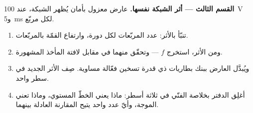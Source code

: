 \begin{problem}
\medskip\noindent\textbf{القسم الثالث --- أثر الشبكة نفسها.}
عارض معزول بأمان يُظهر الشبكة، عند \qty{100}{V} و\qty{5}{ms}
لكل مربّع.
\begin{enumerate}[resume]
  \item تنبّأ بالأثر: عدد المربّعات لكل دورة، وارتفاع القمّة
        بالمربّعات.
  \item ومن الأثر، استخرج $f$  --- وتحقّق
        منهما في مقابل لافتة المأخذ المشهورة.
  \item ويُبدَّل العارض ببنك بطاريات ذي قدرة تسخين فعّالة
        مساوية. صِف الأثر الجديد في سطر واحد.
  \item أغلِق الدفتر بخلاصة الفنّي في ثلاثة أسطر: ماذا يعني
        الخطّ المستوي، وماذا تعني الموجة، وأيّ عدد واحد يتيح
        المقارنة العادلة بينهما.
\end{enumerate}
\end{problem}
